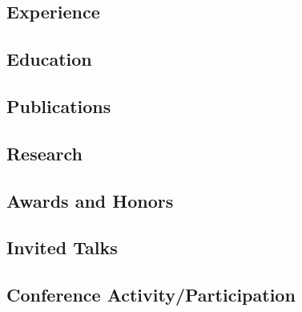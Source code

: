 \documentclass[11pt]{article}
\begin{document}


\begin{center}

\end{center}

\subsection*{Experience}


\subsection*{Education}


\subsection*{Publications}


\subsection*{Research}


\subsection*{Awards and Honors}


\subsection*{Invited Talks}


\subsection*{Conference Activity/Participation}


%









%
\end{document}
